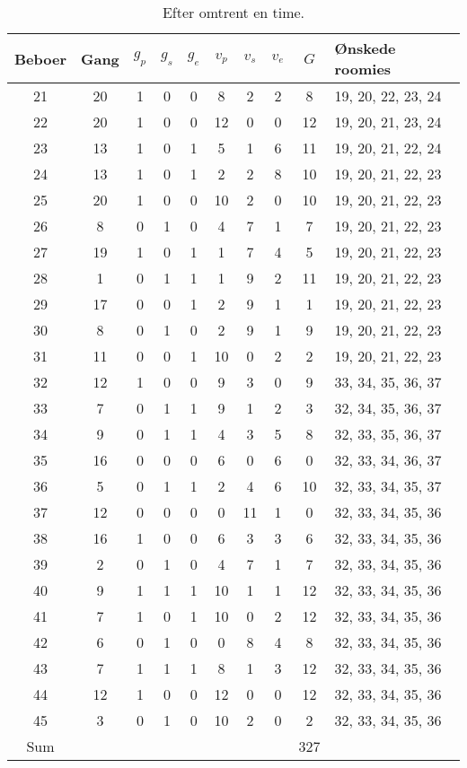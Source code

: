 \documentclass[article,oneside,11pt,a4paper]{memoir}
\newenvironment{assignment}[1]{
\begin{table}[h]
\caption{#1}
\footnotesize
\begin{center}
\begin{tabular}{cccccccccl}
\toprule
Beboer & Gang & $g_p$ & $g_s$ & $g_e$ & $v_p$ & $v_s$ & $v_e$ & $G$ & Ønskede roomies \\ \midrule
}{
\bottomrule
\end{tabular}
\end{center}
\end{table}

}
\begin{document}
\begin{assignment}{Efter omtrent en time.}
    21 &   20 &   1 &   0 &   0 &   8 &   2 &   2 &  8 & 19, 20, 22, 23, 24 \\
    22 &   20 &   1 &   0 &   0 &  12 &   0 &   0 & 12 & 19, 20, 21, 23, 24 \\
    23 &   13 &   1 &   0 &   1 &   5 &   1 &   6 & 11 & 19, 20, 21, 22, 24 \\
    24 &   13 &   1 &   0 &   1 &   2 &   2 &   8 & 10 & 19, 20, 21, 22, 23 \\
    25 &   20 &   1 &   0 &   0 &  10 &   2 &   0 & 10 & 19, 20, 21, 22, 23 \\
    26 &    8 &   0 &   1 &   0 &   4 &   7 &   1 &  7 & 19, 20, 21, 22, 23 \\
    27 &   19 &   1 &   0 &   1 &   1 &   7 &   4 &  5 & 19, 20, 21, 22, 23 \\
    28 &    1 &   0 &   1 &   1 &   1 &   9 &   2 & 11 & 19, 20, 21, 22, 23 \\
    29 &   17 &   0 &   0 &   1 &   2 &   9 &   1 &  1 & 19, 20, 21, 22, 23 \\
    30 &    8 &   0 &   1 &   0 &   2 &   9 &   1 &  9 & 19, 20, 21, 22, 23 \\
    31 &   11 &   0 &   0 &   1 &  10 &   0 &   2 &  2 & 19, 20, 21, 22, 23 \\ \midrule
    32 &   12 &   1 &   0 &   0 &   9 &   3 &   0 &  9 & 33, 34, 35, 36, 37 \\
    33 &    7 &   0 &   1 &   1 &   9 &   1 &   2 &  3 & 32, 34, 35, 36, 37 \\
    34 &    9 &   0 &   1 &   1 &   4 &   3 &   5 &  8 & 32, 33, 35, 36, 37 \\
    35 &   16 &   0 &   0 &   0 &   6 &   0 &   6 &  0 & 32, 33, 34, 36, 37 \\
    36 &    5 &   0 &   1 &   1 &   2 &   4 &   6 & 10 & 32, 33, 34, 35, 37 \\
    37 &   12 &   0 &   0 &   0 &   0 &  11 &   1 &  0 & 32, 33, 34, 35, 36 \\
    38 &   16 &   1 &   0 &   0 &   6 &   3 &   3 &  6 & 32, 33, 34, 35, 36 \\
    39 &    2 &   0 &   1 &   0 &   4 &   7 &   1 &  7 & 32, 33, 34, 35, 36 \\
    40 &    9 &   1 &   1 &   1 &  10 &   1 &   1 & 12 & 32, 33, 34, 35, 36 \\
    41 &    7 &   1 &   0 &   1 &  10 &   0 &   2 & 12 & 32, 33, 34, 35, 36 \\
    42 &    6 &   0 &   1 &   0 &   0 &   8 &   4 &  8 & 32, 33, 34, 35, 36 \\
    43 &    7 &   1 &   1 &   1 &   8 &   1 &   3 & 12 & 32, 33, 34, 35, 36 \\
    44 &   12 &   1 &   0 &   0 &  12 &   0 &   0 & 12 & 32, 33, 34, 35, 36 \\
    45 &    3 &   0 &   1 &   0 &  10 &   2 &   0 &  2 & 32, 33, 34, 35, 36 \\ \midrule
Sum &&&&&&&& 327 & \\
\end{assignment}
\end{document}
